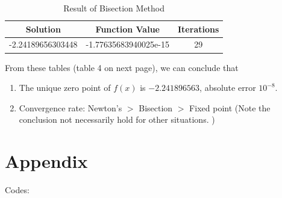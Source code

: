 \documentclass{article}
\begin{document}
\begin{table}[htbp]
\centering
\begin{threeparttable}
\begin{tabular}{ccc}
    \toprule
    Solution & Function Value & Iterations \\
    \midrule
    -2.24189656303448 &   -1.77635683940025e-15   &     29    \\
    \bottomrule
\end{tabular}
\caption{Result of Bisection Method}
\end{threeparttable}
\end{table}

From these tables (table 4 on next page), we can conclude that

\begin{enumerate}
    \item The unique zero point of $f(x)$ is $-2.241896563$, absolute error $10^{-8}$.
    \item Convergence rate: Newton's $>$ Bisection $>$ Fixed point (Note the conclusion not necessarily hold for other situations. )
\end{enumerate}





\newpage

%
%
{}


\section{Appendix}

Codes:


\end{document}
